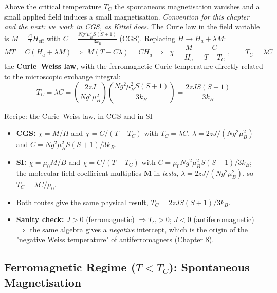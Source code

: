 \documentclass[11pt,a4paper]{article}
\newcommand{\vb}[1]{\mathbf{#1}}
\begin{document}
Above the critical temperature $T_C$ the spontaneous magnetisation vanishes and a small applied field induces a small magnetisation. \emph{Convention for this chapter and the next: we work in CGS, as Kittel does.} The Curie law in the field variable is $M = \frac{C}{T}H_{\mathrm{eff}}$ with $C = \frac{Ng^2\mu_B^2S(S+1)}{3k_B}$ (CGS). Replacing $H \to H_a + \lambda M$:
\begin{equation}
    MT = C(H_a + \lambda M)
    \;\Longrightarrow\;
    M(T - C\lambda) = CH_a
    \;\Longrightarrow\;
    \boxed{\;\chi = \frac{M}{H_a} = \frac{C}{T - T_C}\;},
    \qquad T_C = \lambda C
    \label{eq:curieweiss}
\end{equation}
the \textbf{Curie--Weiss law}, with the ferromagnetic Curie temperature directly related to the microscopic exchange integral:
\begin{equation}
    \boxed{\;T_C = \lambda C
    = \left(\frac{2zJ}{Ng^2\mu_B^2}\right)\left(\frac{Ng^2\mu_B^2S(S+1)}{3k_B}\right)
    = \frac{2zJS(S+1)}{3k_B}\;}
    \label{eq:Tc}
\end{equation}

\begin{methodbox}{Recipe: the Curie--Weiss law, in CGS and in SI}
\begin{itemize}[leftmargin=1.4cm, itemsep=1pt]
    \item \textbf{CGS:} $\chi = M/H$ and $\chi = C/(T-T_C)$ with $T_C = \lambda C$, $\lambda = 2zJ/(Ng^2\mu_B^2)$ and $C = Ng^2\mu_B^2S(S+1)/3k_B$.
    \item \textbf{SI:} $\chi = \mu_0M/B$ and $\chi = C/(T-T_C)$ with $C = \mu_0Ng^2\mu_B^2S(S+1)/3k_B$; the molecular-field coefficient multiplies $\vb{M}$ in \emph{tesla}, $\lambda = 2zJ/(Ng^2\mu_B^2)$, so $T_C = \lambda C/\mu_0$.
    \item Both routes give the same physical result, $T_C = 2zJS(S+1)/3k_B$.
    \item \textbf{Sanity check:} $J>0$ (ferromagnetic) $\Rightarrow T_C>0$; $J<0$ (antiferromagnetic) $\Rightarrow$ the same algebra gives a \emph{negative} intercept, which is the origin of the "negative Weiss temperature" of antiferromagnets (Chapter 8).
\end{itemize}
\end{methodbox}

\subsection{Ferromagnetic Regime \texorpdfstring{($T<T_C$)}{(T < TC)}: Spontaneous Magnetisation}
\end{document}

